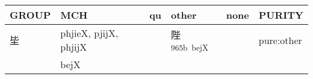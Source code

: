 \documentclass[14pt,a4paper]{scrartcl}
\begin{document}
\begin{longtable}[c]{@{}llllll@{}}
\toprule
\begin{minipage}[b]{0.14\columnwidth}\raggedright\strut
GROUP
\strut\end{minipage} &
\begin{minipage}[b]{0.14\columnwidth}\raggedright\strut
MCH
\strut\end{minipage} &
\begin{minipage}[b]{0.14\columnwidth}\raggedright\strut
qu
\strut\end{minipage} &
\begin{minipage}[b]{0.14\columnwidth}\raggedright\strut
other
\strut\end{minipage} &
\begin{minipage}[b]{0.14\columnwidth}\raggedright\strut
none
\strut\end{minipage} &
\begin{minipage}[b]{0.14\columnwidth}\raggedright\strut
PURITY
\strut\end{minipage}\tabularnewline
\midrule
\endhead
\begin{minipage}[t]{0.14\columnwidth}\raggedright\strut
坒
\strut\end{minipage} &
\begin{minipage}[t]{0.14\columnwidth}\raggedright\strut
phjieX, pjijX, phjijX
\strut\end{minipage} &
\begin{minipage}[t]{0.14\columnwidth}\raggedright\strut
\strut\end{minipage} &
\begin{minipage}[t]{0.14\columnwidth}\raggedright\strut
陛\textsuperscript{965b~bejX}
\strut\end{minipage} &
\begin{minipage}[t]{0.14\columnwidth}\raggedright\strut
\strut\end{minipage} &
\begin{minipage}[t]{0.14\columnwidth}\raggedright\strut
pure:other
\strut\end{minipage}\tabularnewline
\begin{minipage}[t]{0.14\columnwidth}\raggedright\strut
𣬉
\strut\end{minipage} &
\begin{minipage}[t]{0.14\columnwidth}\raggedright\strut
bejX
\strut\end{minipage} &
\begin{minipage}[t]{0.14\columnwidth}\raggedright\strut
\strut\end{minipage} &

\end{longtable}
\end{document}
